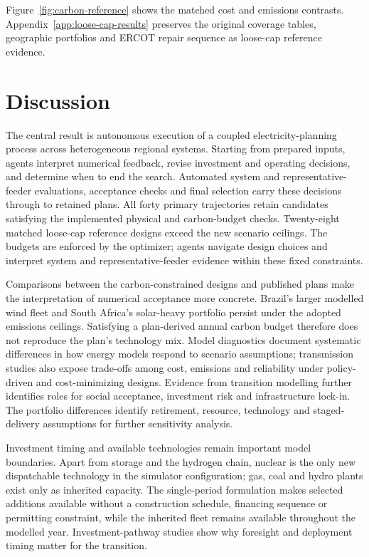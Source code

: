 \documentclass[pdflatex,sn-nature]{sn-jnl}
\begin{document}
Figure~\ref{fig:carbon-reference} shows the matched cost and emissions contrasts. Appendix~\ref{app:loose-cap-results} preserves the original coverage tables, geographic portfolios and ERCOT repair sequence as loose-cap reference evidence.

\section{Discussion}\label{sec:discussion}

The central result is autonomous execution of a coupled electricity-planning process across heterogeneous regional systems. Starting from prepared inputs, agents interpret numerical feedback, revise investment and operating decisions, and determine when to end the search. Automated system and representative-feeder evaluations, acceptance checks and final selection carry these decisions through to retained plans. All forty primary trajectories retain candidates satisfying the implemented physical and carbon-budget checks. Twenty-eight matched loose-cap reference designs exceed the new scenario ceilings. The budgets are enforced by the optimizer; agents navigate design choices and interpret system and representative-feeder evidence within these fixed constraints.

Comparisons between the carbon-constrained designs and published plans make the interpretation of numerical acceptance more concrete. Brazil's larger modelled wind fleet and South Africa's solar-heavy portfolio persist under the adopted emissions ceilings. Satisfying a plan-derived annual carbon budget therefore does not reproduce the plan's technology mix. Model diagnostics document systematic differences in how energy models respond to scenario assumptions\cite{dekker2023fingerprints}; transmission studies also expose trade-offs among cost, emissions and reliability under policy-driven and cost-minimizing designs\cite{senga2026transmission}. Evidence from transition modelling further identifies roles for social acceptance, investment risk and infrastructure lock-in\cite{fischromito2025societal}. The portfolio differences identify retirement, resource, technology and staged-delivery assumptions for further sensitivity analysis.

Investment timing and available technologies remain important model boundaries. Apart from storage and the hydrogen chain, nuclear is the only new dispatchable technology in the simulator configuration; gas, coal and hydro plants exist only as inherited capacity. The single-period formulation makes selected additions available without a construction schedule, financing sequence or permitting constraint, while the inherited fleet remains available throughout the modelled year. Investment-pathway studies show why foresight and deployment timing matter for the transition\cite{heuberger2018myopic,wang2023transition}.
\end{document}
